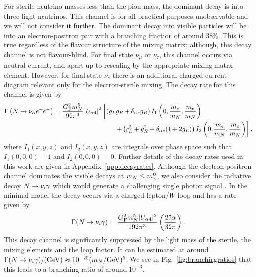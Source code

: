 \documentclass[11pt, a4paper]{article}
\newcommand{\reffig}[1]{Fig.~\ref{#1}}
\newcommand{\refapp}[1]{Appendix~\ref{#1}}
\def\ster{\ensuremath N}
\begin{document}
For sterile neutrino masses less than the pion mass, the dominant decay is into
three light neutrinos. This channel is for all practical purposes unobservable
and we will not consider it further. The dominant decay into visible particles
will be into an electron-positron pair with a branching fraction of around
$38\%$. 
%
This is true regardless of the flavour structure of the mixing matrix; 
%
although, this decay channel is not flavour-blind. For final state $\nu_\mu$ or
$\nu_\tau$, this channel occurs via neutral current, and apart up to rescaling
by the appropriate mixing matrx element. However, for final state $\nu_e$ there
is an additional charged-current diagram relevant only for the electron-sterile
mixing. The decay rate for this channel is given by 
%
\begin{align*} \Gamma\left(\ster\to \nu_\alpha e^+e^-\right) =
\frac{G_\text{F}^2m_\ster^5}{96\pi^3}\left|U_{\alpha 4}\right|^2&\left[\left(
g_Lg_R + \delta_{\alpha e}g_R\right)I_1\left(0,\frac{m_e}{m_\ster}, \frac{
m_e}{m_\ster}\right)\right.\\ &\left.\qquad + \left(g_L^2 + g_R^2 +
\delta_{\alpha
e}(1+2g_L)\right)I_2\left(0,\frac{m_e}{m_\ster},\frac{m_e}{m_\ster}\right)\right],
\end{align*}
%
where $I_1(x,y,z)$ and $I_2(x,y,z)$ are integrals over phase space such that
$I_1(0,0,0) = 1$ and $I_2(0,0,0) = 0$. Further details of the decay rates used
in this work are given in \refapp{app:decayrates}.
%
%
%
Although the electron-positron channel dominates the visible decays at $m_\ster
\leq m_\pi^0$, we also consider the radiative decay $\ster\to\nu_i\gamma$ which
would generate a challenging single photon signal \cite{PhysRevD.25.766}. In
the minimal model the decay occurs via a charged-lepton/$W$ loop and has a rate
given by
%
\[ \Gamma(\ster\to\nu_i\gamma) = \frac{G_\text{F}^2m_\ster^5 |U_{\alpha
4}|^2}{192 \pi^3} \left( \frac{27 \alpha}{32 \pi} \right). \]
%
This decay channel is significantly suppressed by the light mass of the
sterile, the mixing elements and the loop factor. It can be estimated at around
$\Gamma(\ster\to\nu_i\gamma)/(\text{GeV}) \approx 10^{-20}
(m_\ster/\text{GeV})^5$. We see in \reffig{fig:branchingratios} that this leads
to a branching ratio of around $10^{-3}$.
\end{document}
